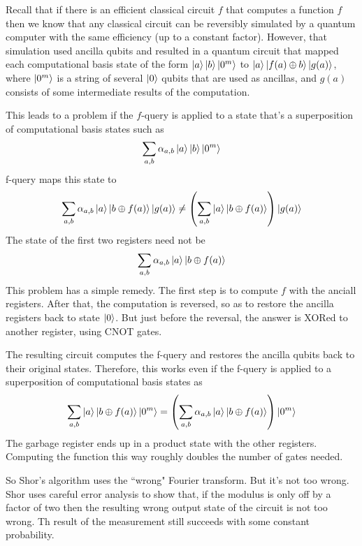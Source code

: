 \begin{importantnote}
    Recall that if there is an efficient classical circuit $f$ that computes a function $f$ then we know that any classical circuit can be reversibly simulated by a quantum computer with the same efficiency (up to a constant factor). However, that simulation used ancilla qubits and resulted in a quantum circuit that mapped each computational basis state of the form $\ket{a}\ket{b}\ket{0^m}$ to $\ket{a}\ket{f(a)\oplus b}\ket{g(a)}$, where $\ket{0^m}$ is a string of several $\ket{0}$ qubits that are used as ancillas, and $g(a)$ consists of some intermediate results of the computation.

    This leads to a problem if the $f$-query is applied to a state that's a superposition of computational basis states such as
    \[
    \sum_{a,b}\alpha_{a,b}\ket{a}\ket{b}\ket{0^m}
    \]
    f-query maps this state to
    \[
    \sum_{a,b}\alpha_{a,b}\ket{a}\ket{b\oplus f(a)}\ket{g(a)} \neq \left(\sum_{a,b}\ket{a}\ket{b\oplus f(a)}\right)\ket{g(a)}
    \]
    The state of the first two registers need not be
    \[
    \sum_{a,b}\alpha_{a,b}\ket{a}\ket{b\oplus f(a)}
    \]
    This problem has a simple remedy. The first step is to compute $f$ with the anciall registers. After that, the computation is reversed, so as to restore the ancilla registers back to state $\ket{0}$. But just before the reversal, the answer is XORed to another register, using CNOT gates.

    The resulting circuit computes the f-query and restores the ancilla qubits back to their original states. Therefore, this works even if the f-query is applied to a superposition of computational basis states as
    \[
    \sum_{a,b}\ket{a}\ket{b\oplus f(a)}\ket{0^m}=\left(\sum_{a,b}\alpha_{a,b}\ket{a}\ket{b\oplus f(a)}\right)\ket{0^m}
    \]
    The garbage register ends up in a product state with the other registers. Computing the function this way roughly doubles the number of gates needed.
    
\end{importantnote}

So Shor's algorithm uses the ``wrong" Fourier transform. But it's not too wrong. Shor uses careful error analysis to show that, if the modulus is only off by a factor of two then the resulting wrong output state of the circuit is not too wrong. Th result of the measurement still succeeds with some constant probability.





\chapterreferences
